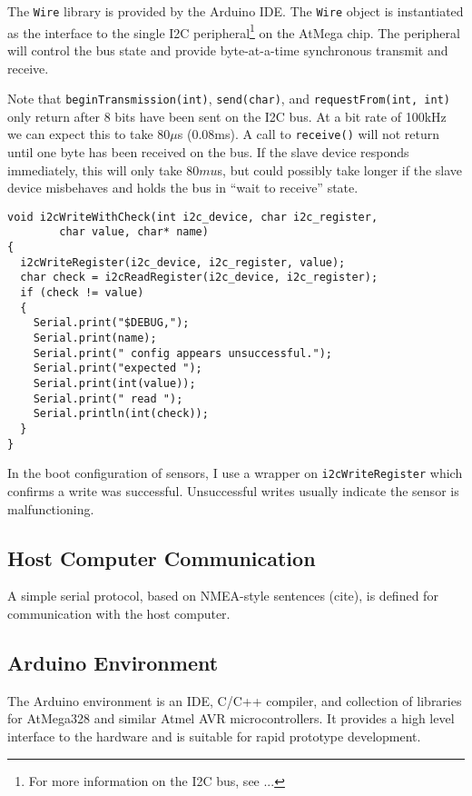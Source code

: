 \documentclass[12pt]{report}
\begin{document}
The \lstinline$Wire$ library is provided by the Arduino IDE.  The \lstinline$Wire$ object is instantiated as the interface to the single I2C peripheral\footnote{For more information on the I2C bus, see ...} on the AtMega chip. The peripheral will control the bus state and provide byte-at-a-time synchronous transmit and receive. 

Note that \lstinline$beginTransmission(int)$, \lstinline$send(char)$, and \lstinline$requestFrom(int, int)$ only return after 8 bits have been sent on the I2C bus. At a bit rate of 100kHz we can expect this to take 80$\mu$s (0.08ms). A call to \lstinline$receive()$ will not return until one byte has been received on the bus. If the slave device responds immediately, this will only take 80$mu$s, but could possibly take longer if the slave device misbehaves and holds the bus in ``wait to receive'' state.
\begin{lstlisting}
void i2cWriteWithCheck(int i2c_device, char i2c_register, 
        char value, char* name)
{
  i2cWriteRegister(i2c_device, i2c_register, value);
  char check = i2cReadRegister(i2c_device, i2c_register);
  if (check != value)
  {
    Serial.print("$DEBUG,");
    Serial.print(name);
    Serial.print(" config appears unsuccessful.");
    Serial.print("expected ");
    Serial.print(int(value));
    Serial.print(" read ");
    Serial.println(int(check));
  }
}
\end{lstlisting}
In the boot configuration of sensors, I use a wrapper on \lstinline$i2cWriteRegister$ which confirms a write was successful. Unsuccessful writes usually indicate the sensor is malfunctioning.


\subsection{Host Computer Communication}
A simple serial protocol, based on NMEA-style sentences (cite), is defined for communication with the host computer. 

\subsection{Arduino Environment}
The Arduino environment is an IDE, C/C++ compiler, and collection of libraries for AtMega328 and similar Atmel AVR microcontrollers. It provides a high level interface to the hardware and is suitable for rapid prototype development. 
\end{document}
